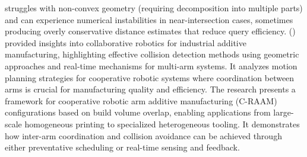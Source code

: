 \documentclass[utf8]{FrontiersinHarvard}
\begin{document}
struggles with non-convex geometry (requiring decomposition into multiple parts) and can experience numerical instabilities in near-intersection cases, sometimes producing overly conservative distance estimates that reduce query efficiency. (\citet{RESCSANSKI2025102925}) provided insights into collaborative robotics for industrial additive manufacturing, highlighting effective collision detection methods using geometric approaches and real-time mechanisms for multi-arm systems. It analyzes motion planning strategies for cooperative robotic systems where coordination between arms is crucial for manufacturing quality and efficiency. The research presents a framework for cooperative robotic arm additive manufacturing (C-RAAM) configurations based on build volume overlap, enabling applications from large-scale homogeneous printing to specialized heterogeneous tooling. It demonstrates how inter-arm coordination and collision avoidance can be achieved through either preventative scheduling or real-time sensing and feedback.
\end{document}
